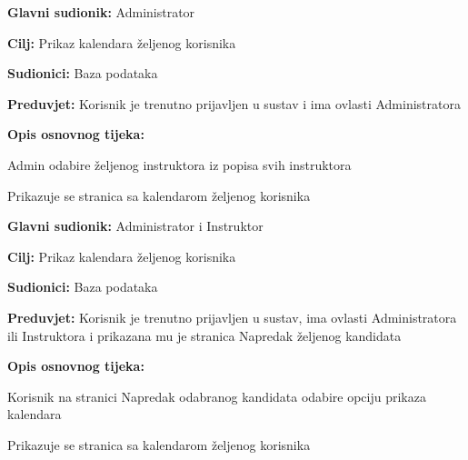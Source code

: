  \noindent {}
	\begin{packed_item}
		
		\item \textbf{Glavni sudionik:} Administrator 
		\item  \textbf{Cilj:} Prikaz kalendara željenog korisnika
		\item  \textbf{Sudionici:} Baza podataka
		\item  \textbf{Preduvjet:} Korisnik je trenutno prijavljen u sustav i ima ovlasti Administratora 
		\item  \textbf{Opis osnovnog tijeka:}
		
		\item[] \begin{packed_enum}
			
			\item Admin odabire željenog instruktora iz popisa svih instruktora
			
                \item Prikazuje se stranica sa kalendarom željenog  korisnika
			
		\end{packed_enum}
		
	\end{packed_item}

 \noindent {}
	\begin{packed_item}
		
		\item \textbf{Glavni sudionik:} Administrator i Instruktor
		\item  \textbf{Cilj:} Prikaz kalendara željenog korisnika
		\item  \textbf{Sudionici:} Baza podataka
		\item  \textbf{Preduvjet:} Korisnik je trenutno prijavljen u sustav, ima ovlasti Administratora ili Instruktora i prikazana mu je stranica Napredak željenog kandidata
		\item  \textbf{Opis osnovnog tijeka:}
		
		\item[] \begin{packed_enum}
			
			
			\item Korisnik na stranici Napredak odabranog kandidata odabire opciju prikaza kalendara
                \item Prikazuje se stranica sa kalendarom željenog  korisnika
			
		\end{packed_enum}
		
	\end{packed_item}


